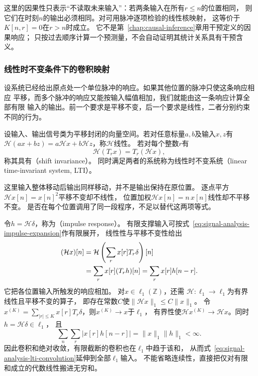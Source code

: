 这里的因果性只表示“不读取未来输入”：若两条输入在所有$r\leq n$的位置相同，
则它们在时刻$n$的输出必须相同。对可用脉冲逐项检验的线性核映射，
这等价于$K[n,r]=0$在$r>n$时成立。
它不是第~\ref{chap:causal-inference}章用干预定义的因果响应；
只按过去顺序计算一个预测量，不会自动证明其统计关系具有干预含义。

\subsubsection{线性时不变条件下的卷积映射}
\label{sec:signal-analysis-lti-convolution}

设系统已经给出原点处一个单位脉冲的响应。如果其他位置的脉冲只使这条响应相应
平移，而多个脉冲的响应又能按输入幅值相加，我们就能由这一条响应计算全部有限
输入的输出。前一个要求是平移不变，后一个要求是线性，二者分别约束不同的行为。
\begin{definition}[线性时不变系统]
  \label{def:signal-analysis-lti-system}
  设输入、输出信号类为平移封闭的向量空间。若对任意标量$a,b$及输入$x,z$有
  $\mathcal H(ax+bz)=a\mathcal Hx+b\mathcal Hz$，称$\mathcal H$线性。
  若对每个整数$r$有
  \[
    \mathcal H(T_rx)=T_r(\mathcal Hx),
  \]
  称其具有（shift invariance）。
  同时满足两者的系统称为线性时不变系统（linear time-invariant system, LTI）。
\end{definition}
这里输入整体移动后输出同样移动，并不是输出保持在原位置。
逐点平方$\mathcal Hx[n]=x[n]^2$平移不变却不线性，
位置加权$\mathcal Hx[n]=n\,x[n]$线性却不平移不变。
是否在每个位置调用了同一段程序，不足以替代这两项等式。

令$h=\mathcal H\delta$，称为（impulse response）。
有限支撑输入可按式~\eqref{eq:signal-analysis-impulse-expansion}作有限展开，
线性性与平移不变性给出
\begin{align}
  (\mathcal Hx)[n]
  &=\mathcal H\left(\sum_r x[r]T_r\delta\right)[n]\notag\\
  &=\sum_r x[r](T_rh)[n]=\sum_r x[r]h[n-r].
  \label{eq:signal-analysis-lti-convolution}
\end{align}
它把各位置输入所触发的响应相加。
对$x\in\ell_1(\mathbb Z)$，还需
$\mathcal H:\ell_1\to\ell_1$为有界线性且平移不变的算子，
即存在常数$C$使$\|\mathcal Hx\|_1\leq C\|x\|_1$。
令$x^{(K)}=\sum_{|r|\leq K}x[r]T_r\delta$，则$x^{(K)}\to x$于$\ell_1$，
有界性使$\mathcal Hx^{(K)}\to\mathcal Hx$。同时$h=\mathcal H\delta\in\ell_1$，
且
\[
  \sum_n\sum_r|x[r]h[n-r]|=\|x\|_1\|h\|_1<\infty.
\]
因此卷积和绝对收敛，有限截断的卷积也在$\ell_1$中趋于该和，
从而式~\eqref{eq:signal-analysis-lti-convolution}延伸到全部$\ell_1$输入。
不能省略连续性，直接把仅对有限和成立的代数线性搬进无穷和。

